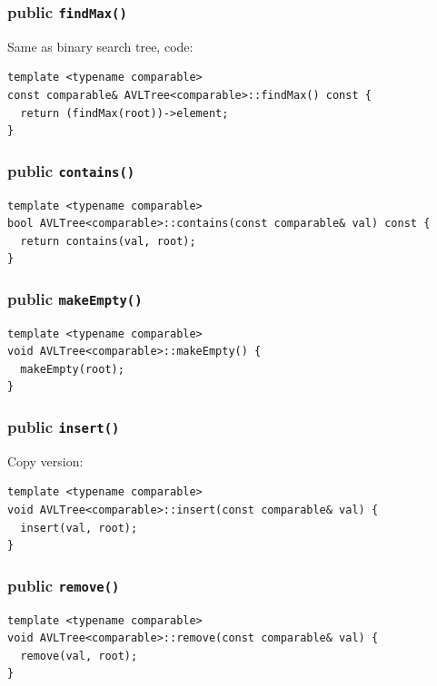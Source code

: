 \documentclass[11pt]{book}
\begin{document}
\subsubsection{public \texttt{findMax()}}
\label{sec:org38ca6a4}
Same as binary search tree, code:
\begin{verbatim}
template <typename comparable>
const comparable& AVLTree<comparable>::findMax() const {
  return (findMax(root))->element;
}
\end{verbatim}
\subsubsection{public \texttt{contains()}}
\label{sec:orgbfcb98d}
\begin{verbatim}
template <typename comparable>
bool AVLTree<comparable>::contains(const comparable& val) const {
  return contains(val, root);
}
\end{verbatim}
\subsubsection{public \texttt{makeEmpty()}}
\label{sec:orgcf45433}
\begin{verbatim}
template <typename comparable>
void AVLTree<comparable>::makeEmpty() {
  makeEmpty(root);
}
\end{verbatim}
\subsubsection{public \texttt{insert()}}
\label{sec:orgf41d0c2}
Copy version:
\begin{verbatim}
template <typename comparable>
void AVLTree<comparable>::insert(const comparable& val) {
  insert(val, root);
}
\end{verbatim}
\subsubsection{public \texttt{remove()}}
\label{sec:org103d783}
\begin{verbatim}
template <typename comparable>
void AVLTree<comparable>::remove(const comparable& val) {
  remove(val, root);
}
\end{verbatim}
\end{document}
